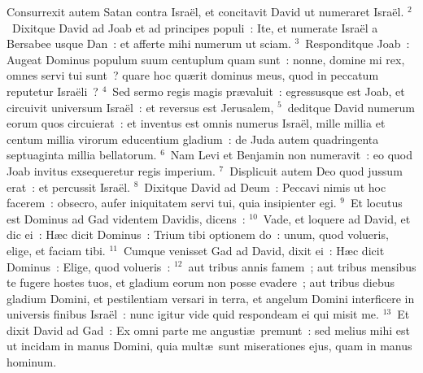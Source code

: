 \bchapter
\lettrine[lines=3,image=true,loversize=0.05,lraise=-0.03]{C}{}onsurrexit autem Satan contra Isra\"el, et concitavit David ut numeraret Isra\"el.
${}^{2}$~Dixitque David ad Joab et ad principes populi~: Ite, et numerate Isra\"el a Bersabee usque Dan~: et afferte mihi numerum ut sciam.
${}^{3}$~Responditque Joab~: Augeat Dominus populum suum centuplum quam sunt~: nonne, domine mi rex, omnes servi tui sunt~? quare hoc qu\ae rit dominus meus, quod in peccatum reputetur Isra\"eli~?
${}^{4}$~Sed sermo regis magis pr\ae valuit~: egressusque est Joab, et circuivit universum Isra\"el~: et reversus est Jerusalem,
${}^{5}$~deditque David numerum eorum quos circuierat~: et inventus est omnis numerus Isra\"el, mille millia et centum millia virorum educentium gladium~: de Juda autem quadringenta septuaginta millia bellatorum.
${}^{6}$~Nam Levi et Benjamin non numeravit~: eo quod Joab invitus exsequeretur regis imperium.
${}^{7}$~Displicuit autem Deo quod jussum erat~: et percussit Isra\"el.
${}^{8}$~Dixitque David ad Deum~: Peccavi nimis ut hoc facerem~: obsecro, aufer iniquitatem servi tui, quia insipienter egi.
${}^{9}$~Et locutus est Dominus ad Gad videntem Davidis, dicens~:
${}^{10}$~Vade, et loquere ad David, et dic ei~: H\ae c dicit Dominus~: Trium tibi optionem do~: unum, quod volueris, elige, et faciam tibi.
${}^{11}$~Cumque venisset Gad ad David, dixit ei~: H\ae c dicit Dominus~: Elige, quod volueris~:
${}^{12}$~aut tribus annis famem~; aut tribus mensibus te fugere hostes tuos, et gladium eorum non posse evadere~; aut tribus diebus gladium Domini, et pestilentiam versari in terra, et angelum Domini interficere in universis finibus Isra\"el~: nunc igitur vide quid respondeam ei qui misit me.
${}^{13}$~Et dixit David ad Gad~: Ex omni parte me angusti\ae\ premunt~: sed melius mihi est ut incidam in manus Domini, quia mult\ae\ sunt miserationes ejus, quam in manus hominum.


